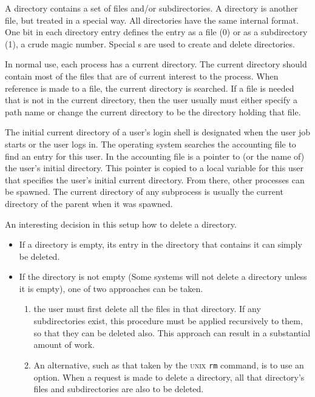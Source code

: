 A directory contains a set of files and/or subdirectories.
A directory is another file, but treated in a special way.
All directories have the same internal format.
One bit in each directory entry defines the entry as a file (0) or as a subdirectory (1), a crude magic number.
Special s are used to create and delete directories.

In normal use, each process has a current directory.
The current directory should contain most of the files that are of current interest to the process.
When reference is made to a file, the current directory is searched.
If a file is needed that is not in the current directory, then the user usually must either specify a path name or change the current directory to be the directory holding that file.

The initial current directory of a user’s login shell is designated when the user job starts or the user logs in.
The operating system searches the accounting file to find an entry for this user.
In the accounting file is a pointer to (or the name of) the user’s initial directory.
This pointer is copied to a local variable for this user that specifies the user’s initial current directory.
From there, other processes can be spawned.
The current directory of any subprocess is usually the current directory of the parent when it was spawned.

An interesting decision in this setup how to delete a directory.
\begin{itemize}[noitemsep]
\item If a directory is empty, its entry in the
  directory that contains it can simply be deleted.
\item If the directory is not empty (Some systems will not delete a directory unless it is empty), one of two approaches can be taken.
  \begin{enumerate}[noitemsep]
  \item the user must first delete all the files in that directory.
    If any subdirectories exist, this procedure must be applied recursively to them, so that they can be deleted also.
    This approach can result in a substantial amount of work.
  \item An alternative, such as that taken by the \textsc{unix} \texttt{rm} command, is to use an option.
    When a request is made to delete a directory, all that directory’s files and subdirectories are also to be deleted.
  \end{enumerate}
\end{itemize}

